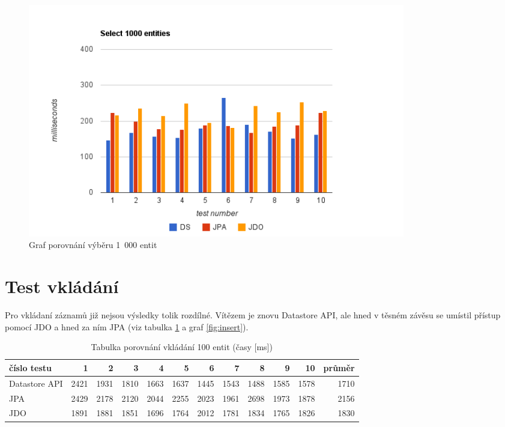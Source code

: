 \begin{figure}[h]
\begin{center}
\includegraphics[width=6.5in]{figures/select.png}
\caption{Graf porovnání výběru 1~000 entit}
\label{fig:select}
\end{center}
\end{figure}

\section{Test vkládání}
Pro vkládaní záznamů již nejsou výsledky tolik rozdílné. Vítězem je znovu Datastore API, ale hned v těsném závěsu se umístil přístup pomocí JDO a hned za ním JPA (viz tabulka \ref{tab:insert} a graf \ref{fig:insert}). 

\begin{table}[h]
\centering
\caption[Tabulka porovnání vkládání 100 entit]{Tabulka porovnání vkládání 100 entit (časy [ms])}\label{tab:insert}
\begin{tabular}{|l|r|r|r|r|r|r|r|r|r|r|r|}
   \hline
číslo testu	& 1		& 2		& 3		& 4		& 5		& 6		& 7		& 8		& 9		& 10		& průměr \\
   \hline
Datastore API	& 2421	& 1931	& 1810	& 1663	& 1637	& 1445	& 1543	& 1488	& 1585	& 1578	& 1710 \\
JPA	& 2429	& 2178	& 2120	& 2044	& 2255	& 2023	& 1961	& 2698	& 1973	& 1878	& 2156 \\
JDO	& 1891	& 1881	& 1851	& 1696	& 1764	& 2012	& 1781	& 1834	& 1765	& 1826	& 1830 \\
   \hline
\end{tabular}
\end{table}

